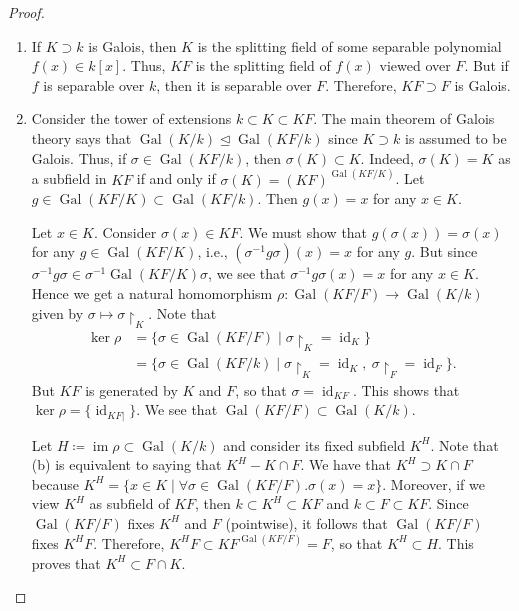 \documentclass[10pt,letterpaper,cm]{nupset}
\theoremstyle{definition}
\newcommand{\1}{\mathbf{1}}
\newcommand{\0}{\vec 0}
\DeclareMathOperator{\id}{id}
\DeclareMathOperator{\gal}{Gal}
\DeclareMathOperator{\im}{im}
\begin{document}
\begin{proof} $ $
\begin{enumerate}[label=(\alph*)]
\item  If $K\supset k$ is Galois, then $K$ is the splitting field of some separable polynomial $f(x) \in k[x]$. Thus, $KF$ is the splitting field of $f(x)$ viewed over $F$. But if $f$ is separable over $k$, then it is separable over $F$. Therefore, $KF \supset F$ is Galois.
\item Consider the tower of extensions $k \subset K \subset KF$. The main theorem of Galois theory says that $\gal(K/k) \unlhd \gal(KF/k)$ since $K\supset k$ is assumed to be Galois. Thus, if $\sigma \in \gal(KF/k)$, then $\sigma(K) \subset K$. Indeed, $\sigma(K) = K$ as a subfield in $KF$ if and only if $\sigma(K) = (KF)^{\gal(KF/K)}$. Let $g\in \gal(KF/K) \subset \gal(KF/k)$. Then $g(x) = x$ for any $x\in K$. 

Let $x\in K$. Consider $\sigma(x) \in KF$.  We must show that $g(\sigma(x)) = \sigma(x)$ for any $g \in \gal(KF/K)$, i.e., $(\sigma^{-1}{g}{\sigma})(x) = x$ for any $g$. But since $\sigma^{-1}{g}{\sigma} \in \sigma^{-1}{\gal(KF/K)}{\sigma}$, we see that $\sigma^{-1}{g}{\sigma}(x) = x$ for any $x\in K$. Hence we get a natural homomorphism $ \rho : \gal(KF/F) \to \gal(K/k)$ given by $\sigma \mapsto \sigma \restriction_K$.  Note that \begin{align*} \ker{\rho} & = \{\sigma \in \gal(KF/F) \mid \sigma \restriction_K = \id_K\}
\\ & = \{\sigma \in \gal(KF/k) \mid \sigma \restriction_K = \id_K, \ \sigma \restriction_F = \id_F\}.
\end{align*}  But $KF$ is generated by $K$ and $F$, so that $\sigma = \id_{KF}$. This shows that $\ker{\rho} = \{\id_{KF|}\}$. We see that $\gal(KF/F) \subset \gal(K/k)$. 

Let $H \coloneqq  \im{\rho} \subset \gal(K/k)$ and consider its fixed subfield $K^H$. Note that (b) is equivalent to saying that $K^H - K \cap F$. We have that $K^H \supset K \cap F$ because $K^H = \{x\in K \mid \forall \sigma \in \gal(KF/F).\sigma(x) =x\}$. Moreover, if we view $K^H$ as subfield of $KF$, then $k \subset K^H \subset KF$ and $k \subset F \subset KF$.  Since $\gal(KF/F)$ fixes $K^H$ and $F$ (pointwise), it follows that $\gal(KF/F)$ fixes $K^HF$. Therefore, $K^HF \subset KF^{\gal(KF/F)} = F$, so that $K^H \subset H$. This proves that $K^H \subset F \cap K$. 
\end{enumerate}
\end{proof}
\end{document}
